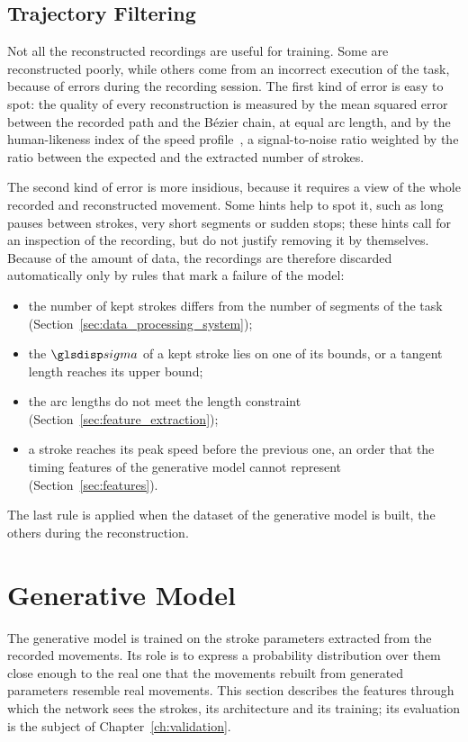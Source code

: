 \documentclass[12pt]{report}
\begin{document}
\subsection{Trajectory Filtering}
Not all the reconstructed recordings are useful for training. Some are reconstructed poorly, while others come from an incorrect execution of the task, because of errors during the recording session. The first kind of error is easy to spot: the quality of every reconstruction is measured by the mean squared error between the recorded path and the Bézier chain, at equal arc length, and by the human-likeness index of the speed profile~\cite{coccaro}, a signal-to-noise ratio weighted by the ratio between the expected and the extracted number of strokes.

The second kind of error is more insidious, because it requires a view of the whole recorded and reconstructed movement. Some hints help to spot it, such as long pauses between strokes, very short segments or sudden stops; these hints call for an inspection of the recording, but do not justify removing it by themselves. Because of the amount of data, the recordings are therefore discarded automatically only by rules that mark a failure of the model:
\begin{itemize}
    \item the number of kept strokes differs from the number of segments of the task (Section~\ref{sec:data_processing_system});
    \item the $\sym{sigma}$ of a kept stroke lies on one of its bounds, or a tangent length reaches its upper bound;
    \item the arc lengths do not meet the length constraint (Section~\ref{sec:feature_extraction});
    \item a stroke reaches its peak speed before the previous one, an order that the timing features of the generative model cannot represent (Section~\ref{sec:features}).
\end{itemize}
The last rule is applied when the dataset of the generative model is built, the others during the reconstruction.

\section{Generative Model}
The generative model is trained on the stroke parameters extracted from the recorded movements. Its role is to express a probability distribution over them close enough to the real one that the movements rebuilt from generated parameters resemble real movements. This section describes the features through which the network sees the strokes, its architecture and its training; its evaluation is the subject of Chapter~\ref{ch:validation}.
\end{document}
